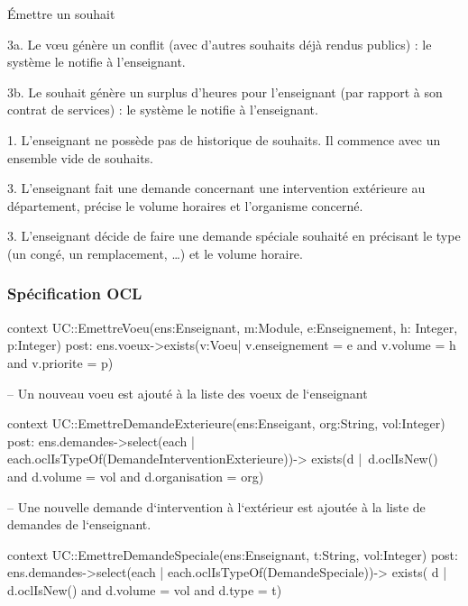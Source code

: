 \begin{ocl}
\begin{usecase}{\'Emettre un souhait}
\begin{extension}
 \item [3a.] Le v\oe u génère un conflit (avec d'autres souhaits déjà rendus publics) : le système le notifie à l'enseignant.
 \item [3b.] Le souhait génère un surplus d'heures pour l'enseignant (par rapport à son contrat de services) : le système le notifie à l'enseignant.
\end{extension}


\begin{variation}
	\item [1.] L'enseignant ne possède pas de historique de souhaits. Il commence avec un ensemble vide de souhaits.
	\item [3.] L'enseignant fait une demande concernant une intervention extérieure au département, précise le volume horaires et l'organisme concerné.
	\item [3.] L'enseignant décide de faire une demande spéciale souhaité en précisant le type (un congé, un remplacement, \dots) et le volume horaire.
\end{variation}
\end{usecase}

\subsubsection{Spécification OCL}
\begin{ocl}
context UC::EmettreVoeu(ens:Enseignant, m:Module, e:Enseignement, h: Integer, p:Integer)
post: 
ens.voeux->exists(v:Voeu| v.enseignement = e and v.volume = h and v.priorite = p)

-- Un nouveau voeu est ajouté à la liste des voeux de l`enseignant
\end{ocl}

\begin{ocl}
context UC::EmettreDemandeExterieure(ens:Enseigant, org:String, vol:Integer)
post: 
	ens.demandes->select(each | each.oclIsTypeOf(DemandeInterventionExterieure))->
		exists(d | d.oclIsNew() and d.volume = vol and d.organisation = org)
		
-- Une nouvelle demande d`intervention à l`extérieur est ajoutée à la liste de demandes de l`enseignant.
\end{ocl}

\begin{ocl}
context UC::EmettreDemandeSpeciale(ens:Enseignant, t:String, vol:Integer)
post:
	ens.demandes->select(each | each.oclIsTypeOf(DemandeSpeciale))->
		exists( d | d.oclIsNew() and d.volume = vol and d.type = t)


\end{ocl}
\end{ocl}
